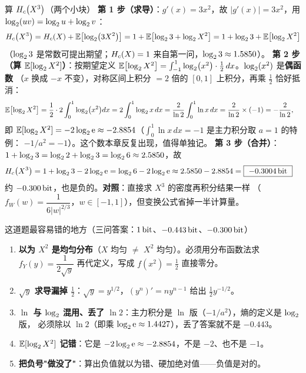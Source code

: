 \begin{calc}{算 $H_{c}\!\left(X^3\right)$（两个小块）}
\textbf{第 1 步（求导）}：$g'(x)=3x^2$，故 $|g'(x)|=3x^2$，用 $\log_{2}(uv)=\log_{2} u+\log_{2} v$：
\[
H_{c}\!\left(X^3\right)=H_{c}\!\left(X\right)+\operatorname{\mathbb{E}}\bigl[\log_{2}\bigl(3X^2\bigr)\bigr]
=1+\operatorname{\mathbb{E}}\bigl[\log_{2}3+\log_{2} X^2\bigr]=1+\log_{2}3+\operatorname{\mathbb{E}}\bigl[\log_{2} X^2\bigr]
\]
（$\log_{2}3$ 是常数可提出期望；$H_{c}\!\left(X\right)=1$ 来自第一问，$\log_{2}3\approx1.5850$）。
\textbf{第 2 步（算 $\operatorname{\mathbb{E}}[\log_{2} X^2]$）}：按期望定义 $\operatorname{\mathbb{E}}\bigl[\log_{2} X^2\bigr]
=\int_{-1}^{1}\log_{2}\bigl(x^2\bigr)\cdot\frac12\,dx$。$\log_{2}(x^2)$ 是\textbf{偶函数}
（$x$ 换成 $-x$ 不变），对称区间上积分 $=2$ 倍的 $[0,1]$ 上积分，再乘 $\tfrac12$ 恰好抵消：
\begin{align*}
\operatorname{\mathbb{E}}\bigl[\log_{2} X^2\bigr]&=\frac12\cdot2\int_0^1\log_{2}\bigl(x^2\bigr)dx
=2\int_0^1\log_{2} x\,dx=\frac{2}{\ln2}\int_0^1\ln x\,dx
=\frac{2}{\ln2}\times(-1)=-\frac{2}{\ln2},
\end{align*}
即 $\operatorname{\mathbb{E}}[\log_{2} X^2]=-2\log_{2}\mathrm{e}\approx-2.8854$（$\int_0^1\ln x\,dx=-1$ 是主力积分取 $a=1$ 的特例：
$-1/a^2=-1$）。这个数本章反复出现，值得单独记。
\textbf{第 3 步（合并）}：$1+\log_{2}3=\log_{2}2+\log_{2}3=\log_{2}6\approx2.5850$，故
\begin{align*}
H_{c}\!\left(X^3\right)&=1+\log_{2}3-2\log_{2}\mathrm{e}=\log_{2}6-2\log_{2}\mathrm{e}
\approx2.5850-2.8854=\boxed{\ -0.3004\,\text{bit}\ }
\end{align*}
约 $-0.300\,\text{bit}$，也是负的。\textbf{对照}：直接求 $X^3$ 的密度再积分结果一样
（$f_W(w)=\dfrac{1}{6|w|^{2/3}}$，$w\in[-1,1]$），但变换公式省掉一半计算量。
\end{calc}

\begin{qa}{这道题最容易错的地方（三问答案：$1\,\text{bit}$、$-0.443\,\text{bit}$、$-0.300\,\text{bit}$）}
\begin{enumerate}[leftmargin=1.6em,itemsep=1pt,topsep=1pt]
\item \textbf{以为 $X^2$ 是均匀分布}（$X$ 均匀 $\ne$ $X^2$ 均匀）。必须用分布函数法求
$f_Y(y)=\dfrac{1}{2\sqrt y}$ 再代定义，写成 $f(x^2)=\tfrac12$ 直接零分。
\item \textbf{$\sqrt y$ 求导漏掉 $\tfrac12$}：$\sqrt y=y^{1/2}$，$(y^n)'=ny^{n-1}$ 给出
$\tfrac12y^{-1/2}$。
\item \textbf{$\ln$ 与 $\log_{2}$ 混用、丢了 $\ln2$}：主力积分是 $\ln$ 版（$-1/a^2$），熵的定义是 $\log_{2}$ 版，
必须除以 $\ln2$（即乘 $\log_{2}\mathrm{e}\approx1.4427$），丢了答案就不是 $-0.443$。
\item \textbf{$\operatorname{\mathbb{E}}[\log_{2} X^2]$ 记错}：它是 $-2\log_{2}\mathrm{e}\approx-2.8854$，不是 $-2$、也不是 $-1$。
\item \textbf{把负号"做没了"}：算出负值就以为错、硬加绝对值——负值是对的。
\end{enumerate}
\end{qa}

